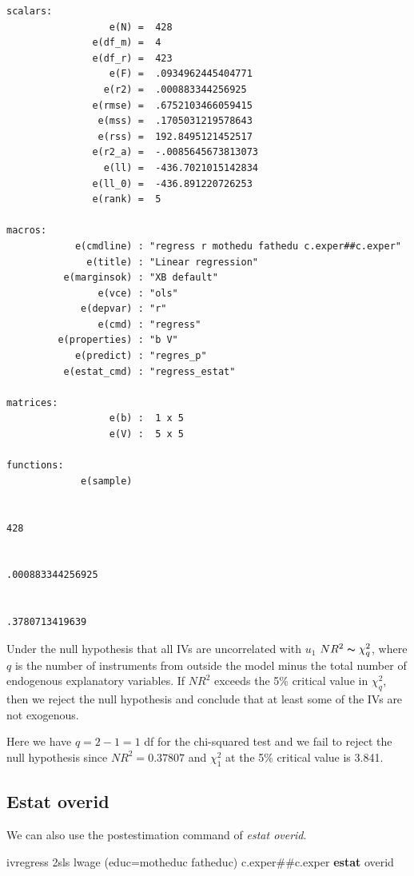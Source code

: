 \documentclass[
]{book}
\newenvironment{Shaded}{\begin{snugshade}}{\end{snugshade}}
\newcommand{\KeywordTok}[1]{\textcolor[rgb]{0.13,0.29,0.53}{\textbf{#1}}}
\newcommand{\NormalTok}[1]{#1}
\begin{document}
\begin{verbatim}
scalars:
                  e(N) =  428
               e(df_m) =  4
               e(df_r) =  423
                  e(F) =  .0934962445404771
                 e(r2) =  .000883344256925
               e(rmse) =  .6752103466059415
                e(mss) =  .1705031219578643
                e(rss) =  192.8495121452517
               e(r2_a) =  -.0085645673813073
                 e(ll) =  -436.7021015142834
               e(ll_0) =  -436.891220726253
               e(rank) =  5

macros:
            e(cmdline) : "regress r mothedu fathedu c.exper##c.exper"
              e(title) : "Linear regression"
          e(marginsok) : "XB default"
                e(vce) : "ols"
             e(depvar) : "r"
                e(cmd) : "regress"
         e(properties) : "b V"
            e(predict) : "regres_p"
          e(estat_cmd) : "regress_estat"

matrices:
                  e(b) :  1 x 5
                  e(V) :  5 x 5

functions:
             e(sample)   


428


.000883344256925


.3780713419639
\end{verbatim}

Under the null hypothesis that all IVs are uncorrelated with \(u_1\)
\(NR^2 \thicksim \chi^2_{q}\), where \(q\) is the number of instruments from outside the model minus the total number of endogenous explanatory variables. If \(N R^2\) exceeds the 5\% critical value in \(\chi^2_q\), then we reject the null hypothesis and conclude that at least some of the IVs are not exogenous.

Here we have \(q=2-1=1\) df for the chi-squared test and we fail to reject the
null hypothesis since \(N R^2=0.37807\) and \(\chi^2_1\) at the 5\% critical value is 3.841.

\subsection{Estat overid}\label{estat-overid}

We can also use the postestimation command of \emph{estat overid}.

\begin{Shaded}
\begin{Highlighting}[]
\NormalTok{ivregress 2sls lwage (educ=motheduc fatheduc) c.exper\#\#c.exper}
\KeywordTok{estat}\NormalTok{ overid}
\end{Highlighting}
\end{Shaded}
\end{document}
